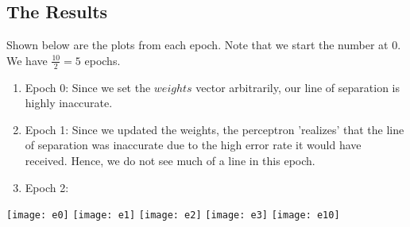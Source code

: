 \subsection{The Results}
Shown below are the plots from each epoch. Note that we start the number at $0$. We have $\frac{10}{2} = 5$ epochs.

	\begin{enumerate}
		\item Epoch 0: Since we set the $weights$ vector arbitrarily, our line of separation is highly inaccurate.
		
		\item Epoch 1: Since we updated the weights, the perceptron 'realizes' that the line of separation was inaccurate due to the high error rate it would have received. Hence, we do not see much of a line in this epoch.
		
		\item Epoch 2: 
	\end{enumerate}

\begin{center}
	\texttt{[image: e0]}
	\texttt{[image: e1]}
	\texttt{[image: e2]}
	\texttt{[image: e3]}
	\texttt{[image: e10]}
\end{center}
